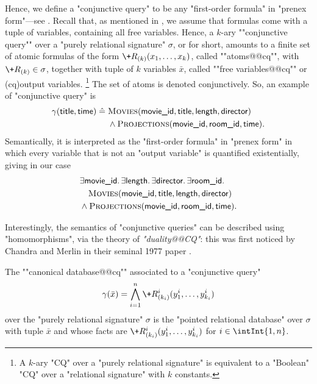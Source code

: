 Hence, we define a \AP"conjunctive query" to be
any "first-order formula" in "prenex form"---see .
Recall that, as mentioned in ,
we assume that formulas come with a tuple of variables,
containing all free variables.
Hence, a $k$-ary \AP""conjunctive query"" over a "purely relational signature" $\sigma$,
or  for short, amounts to a finite set
of atomic formulas of the form $\+R_{(k)}(x_1,\dotsc,x_k)$,
called ""atoms@@cq"", with $\+R_{(k)} \in \sigma$,
together with tuple of $k$ variables $\bar x$, called \AP""free variables@@cq""
or \reintro(cq){output variables}.%
\footnote{A $k$-ary "CQ" over a "purely relational signature"
is equivalent to a "Boolean" "CQ" over a "relational signature"
with $k$ constants.}
The set of atoms is denoted conjunctively.
So, an example of "conjunctive query" is
\begin{align*}
	\gamma(\textsf{title}, \textsf{time}) \mathrel{\hat{=}}\; 
	& \textsc{Movies}(\textsf{movie\_id}, \textsf{title}, \textsf{length}, \textsf{director}) \\
	& \land
	\textsc{Projections}(\textsf{movie\_id}, \textsf{room\_id}, \textsf{time}).
\end{align*} 
Semantically, it is interpreted as the "first-order formula" in "prenex form"
in which every variable that is not an "output variable" is quantified existentially,
giving in our case
\begin{align*}
	& \exists \textsf{movie\_id}.\, 
	\exists \textsf{length}.\, 
	\exists \textsf{director}.\,
	\exists \textsf{room\_id}.\, \\
	& \hphantom{\land~} \textsc{Movies}(\textsf{movie\_id}, \textsf{title}, \textsf{length}, \textsf{director}) \\
	& \land
	\textsc{Projections}(\textsf{movie\_id}, \textsf{room\_id}, \textsf{time}).
\end{align*} 

Interestingly, the semantics of "conjunctive queries" can be described using "homomorphisms",
via the theory of \emph{"duality@@CQ"}: this was first noticed by Chandra and Merlin in
their seminal 1977 paper \cite{ChandraMerlin1977Implementation}.
\begin{definition}
	The \AP""canonical database@@cq"" associated to a "conjunctive query"
	\[
		\gamma(\bar x) = \bigwedge_{i=1}^n \+R^i_{(k_i)}(y^i_1,\dotsc,y^i_{k_i})
	\]
	over the "purely relational signature" $\sigma$ is the "pointed relational database"
	over $\sigma$ with tuple $\bar x$ and whose facts are
	$\+R^i_{(k_i)}(y^i_1,\dotsc,y^i_{k_i})$ for $i \in \intInt{1,n}$.
\end{definition}

